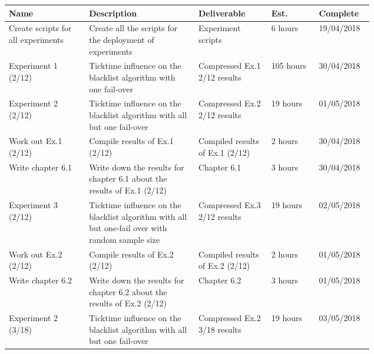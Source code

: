 
%

\begin{longtable}{| p{0.22\linewidth} | p{0.3\linewidth}| p{0.2\linewidth} | l | l |}
\hline
\textbf{Name} & \textbf{Description} & \textbf{Deliverable} & \textbf{Est.} & \textbf{Complete} \\ \hline

Create scripts for all experiments & Create all the scripts for the deployment of experiments & Experiment scripts & 6 hours & 19/04/2018 \\
\hline

Experiment 1 (2/12) & Ticktime influence on the blacklist algorithm with one fail-over & Compressed Ex.1 2/12 results & 105 hours & 30/04/2018 \\ 
\hline

Experiment 2 (2/12) & Ticktime influence on the blacklist algorithm with all but one fail-over & Compressed Ex.2 2/12 results & 19 hours & 01/05/2018 \\
\hline

Work out Ex.1 (2/12) & Compile results of Ex.1 (2/12) & Compiled results of Ex.1 (2/12) & 2 hours & 30/04/2018 \\
\hline  

Write chapter 6.1 & Write down the results for chapter 6.1 about the results of Ex.1 (2/12) & Chapter 6.1 & 3 hours & 30/04/2018 \\
\hline

Experiment 3 (2/12) & Ticktime influence on the blacklist algorithm with all but one-fail over with random sample size & Compressed Ex.3 2/12 results & 19 hours & 02/05/2018 \\
\hline

Work out Ex.2 (2/12) & Compile results of Ex.2 (2/12) & Compiled results of Ex.2 (2/12) & 2 hours & 01/05/2018 \\
\hline 

Write chapter 6.2 & Write down the results for chapter 6.2 about the results of Ex.2 (2/12) & Chapter 6.2 & 3 hours & 01/05/2018 \\
\hline

Experiment 2 (3/18) & Ticktime influence on the blacklist algorithm with all but one fail-over & Compressed Ex.2 3/18 results & 19 hours & 03/05/2018 \\
\hline


\end{longtable}
